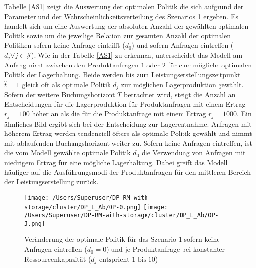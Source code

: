 Tabelle \ref{AS1} zeigt die Auswertung der optimalen Politik die sich aufgrund der Parameter und der Wahrscheinlichkeitsverteilung des Szenarios 1 ergeben. Es handelt sich um eine Auswertung der absoluten Anzahl der gewählten optimalen Politik sowie um die jeweilige Relation zur gesamten Anzahl der optimalen Politiken sofern keine Anfrage eintrifft ($d_0$) und sofern Anfragen eintreffen ($d_j\forall j \in\mathcal{J}$). Wie in der Tabelle \ref{AS1} zu erkennen, unterscheidet das Modell am Anfang nicht zwischen den Produktanfragen $1$ oder $2$ für eine mögliche optimalen Politik der Lagerhaltung. Beide werden bis zum Leistungserstellungszeitpunkt $\hat t=1$ gleich oft als optimale Politik $d_{j}$ zur möglichen Lagerproduktion gewählt. Sofern der weitere Buchungshorizont $T$ betrachtet wird, steigt die Anzahl an Entscheidungen für die Lagerproduktion für Produktanfragen mit einem Ertrag $r_j=100$ höher an als die für die Produktanfrage mit einem Ertrag $r_j=1000$. Ein ähnliches Bild ergibt sich bei der Entscheidung zur Lagerentnahme. Anfragen mit höherem Ertrag werden tendenziell öfters als optimale Politik gewählt und nimmt mit ablaufenden Buchungshorizont weiter zu. Sofern keine Anfragen eintreffen, ist die vom Modell gewählte optimale Politik $d_{0}$ die Verwendung von Anfragen mit niedrigem Ertrag für eine mögliche Lagerhaltung. Dabei greift das Modell häufiger auf die Ausführungsmodi der Produktanfragen für den mittleren Bereich der Leistungserstellung zurück.

\begin{figure}[h!]     
\begin{center}
\texttt{[image: /Users/Superuser/DP-RM-with-storage/cluster/DP\_L\_Ab/OP-0.png]}
\texttt{[image: /Users/Superuser/DP-RM-with-storage/cluster/DP\_L\_Ab/OP-J.png]}
    \caption{Veränderung der optimale Politik für das Szenario 1 sofern keine Anfragen eintreffen ($d_0=0$) und je Produktanfrage bei konstanter Ressourcenkapazität ($d_j\text{ entspricht }1\text{ bis }10$)}  \label{SV1}
  \end{center}
\end{figure}

